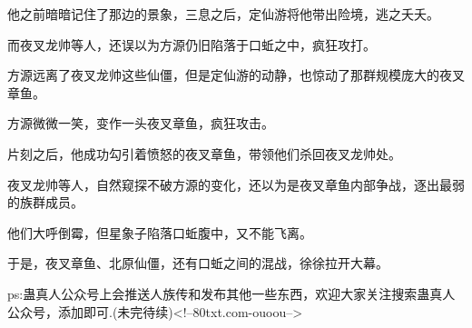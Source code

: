 \begin{this_body}
他之前暗暗记住了那边的景象，三息之后，定仙游将他带出险境，逃之夭夭。

而夜叉龙帅等人，还误以为方源仍旧陷落于口蚯之中，疯狂攻打。

方源远离了夜叉龙帅这些仙僵，但是定仙游的动静，也惊动了那群规模庞大的夜叉章鱼。

方源微微一笑，变作一头夜叉章鱼，疯狂攻击。

片刻之后，他成功勾引着愤怒的夜叉章鱼，带领他们杀回夜叉龙帅处。

夜叉龙帅等人，自然窥探不破方源的变化，还以为是夜叉章鱼内部争战，逐出最弱的族群成员。

他们大呼倒霉，但星象子陷落口蚯腹中，又不能飞离。

于是，夜叉章鱼、北原仙僵，还有口蚯之间的混战，徐徐拉开大幕。

ps:蛊真人公众号上会推送人族传和发布其他一些东西，欢迎大家关注搜索蛊真人公众号，添加即可.(未完待续)<!--80txt.com-ouoou-->

\end{this_body}

